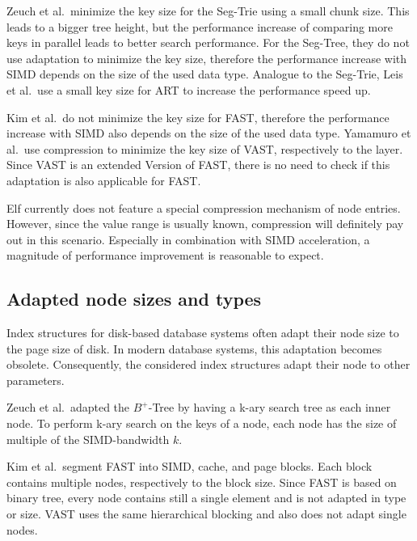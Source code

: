 \documentclass[runningheads,a4paper]{llncs}
\begin{document}
Zeuch et al.\ minimize the key size for the Seg-Trie using a small chunk size. This leads to a bigger tree height, but the performance increase of comparing more keys in parallel leads to better search performance. For the Seg-Tree, they do not use adaptation to minimize the key size, therefore the performance increase with SIMD depends on the size of the used data type. Analogue to the Seg-Trie, Leis et al.\ use a small key size for ART to increase the performance speed up.

Kim et al.\ do not minimize the key size for FAST, therefore the performance increase with SIMD also depends on the size of the used data type. Yamamuro et al.\ use compression to minimize the key size of VAST, respectively to the layer. Since VAST is an extended Version of FAST, there is no need to check if this adaptation is also applicable for FAST. 

Elf currently does not feature a special compression mechanism of node entries. However, since the value range is usually known, compression will definitely pay out in this scenario. Especially in combination with SIMD acceleration, a magnitude of performance improvement is reasonable to expect.

\subsection{Adapted node sizes and types}
Index structures for disk-based database systems often adapt their node size to the page size of disk. In modern database systems, this adaptation becomes obsolete. Consequently, the considered index structures adapt their node to other parameters. 

Zeuch et al.\ adapted the $B^+$-Tree by having a k-ary search tree as each inner node. To perform k-ary search on the keys of a node, each node has the size of multiple of the SIMD-bandwidth $k$.

Kim et al.\ segment FAST into SIMD, cache, and page blocks. Each block contains multiple nodes, respectively to the block size. Since FAST is based on binary tree, every node contains still a single element and is not adapted in type or size. VAST uses the same hierarchical blocking and also does not adapt single nodes.
\end{document}
